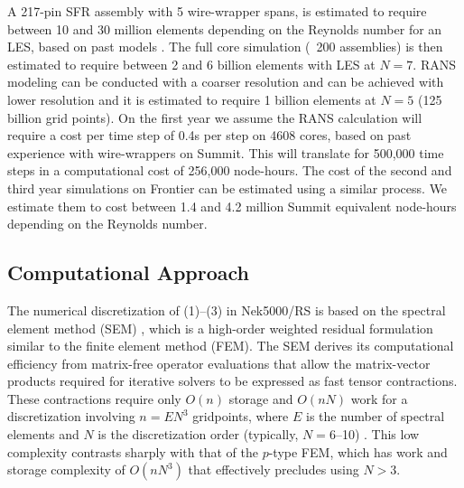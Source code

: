 A 217-pin SFR assembly with 5 wire-wrapper spans, is estimated to require
between 10 and 30 million elements depending on the Reynolds number for an LES,
based on past models \cite{merzari2020toward}. The full core simulation (~200
assemblies) is then estimated to require between 2 and 6 billion elements with
LES at $N=7$.  RANS modeling can be conducted with a coarser resolution and can
be achieved with lower resolution and it is estimated to require 1 billion
elements at $N=5$ (125 billion grid points).
%
On the first year we assume the RANS calculation will require a cost per time
step of 0.4s per step on 4608 cores, based on past experience with
wire-wrappers on Summit.  This will translate for 500,000 time steps in a
computational cost of 256,000 node-hours.
%
The cost of the second and third year simulations on Frontier can be estimated
using a similar process. We estimate them to cost between 1.4 and 4.2 million
Summit equivalent node-hours depending on the Reynolds number.

\vspace{-.25in}
\subsection{Computational Approach }
\vspace{-.2in}

The numerical discretization of (1)--(3) in Nek5000/RS is based on the spectral
element method (SEM) \cite{pat84}, which is a high-order weighted residual
formulation similar to the finite element method (FEM).  The SEM derives its
computational efficiency from matrix-free operator evaluations that allow the
matrix-vector products required for iterative solvers to be expressed as fast
tensor contractions.  These contractions require only $O(n)$ storage and
$O(nN)$ work for a discretization involving $n=EN^3$ gridpoints, where $E$ is
the number of spectral elements and $N$ is the discretization order (typically,
$N=$6--10) \cite{dfm02}.  This low complexity contrasts sharply with that of
the $p$-type FEM, which has work and storage complexity of $O(nN^3)$ that
effectively precludes using $N>3$.  

